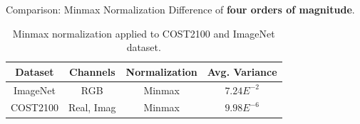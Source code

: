 \documentclass{beamer}
\newcommand{\fignocap}[2]{
	\begin{figure}[!hbtp]
	    \centering
		\texttt{[image: \#2]}
	\end{figure}
}
\begin{document}
    \begin{frame}{Comparison: Minmax Normalization}
      Difference of \textbf{four orders of magnitude}.
      \begin{table}[htb]
        \begin{center}
          \begin{tabular}{|c|c|c|c|}
          \hline
          \textbf{Dataset} & \textbf{Channels} & \textbf{Normalization} & \textbf{Avg. Variance} \\ \hline
          ImageNet       & RGB                 & Minmax                 & \underline{$7.24E^{-2}$}       \\ \hline
          COST2100       & Real, Imag          & Minmax                 & \underline{$9.98E^{-6}$}       \\ \hline
          \end{tabular}
          \caption{Minmax normalization applied to COST2100 and ImageNet dataset.}
          \label{tab:minmax-compare} 
        \end{center}
      \end{table}
    \end{frame}

\end{document}
